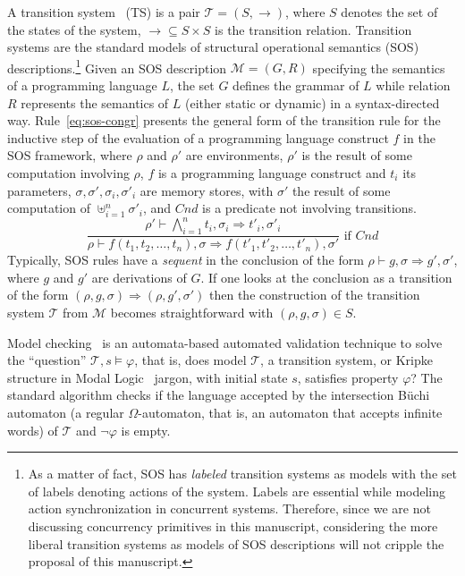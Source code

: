 \documentclass[a4paper,openany]{book}
\begin{document}
A transition system~\cite{arnold1994finite} (TS) is a pair $\mathcal{T} = (S, \rightarrow)$, where $S$ denotes the set of the states of the system, $\rightarrow \subseteq S \times S$ is the transition relation. 
%
Transition systems are the standard models of structural operational semantics (SOS) descriptions.\footnote{As a matter of fact, SOS has \emph{labeled} transition systems as models with the set of labels denoting actions of the system. Labels are essential while modeling action synchronization in concurrent systems. Therefore, since we are not discussing concurrency primitives in this manuscript, considering the more liberal transition systems as models of SOS descriptions will not cripple the proposal of this manuscript.} Given an SOS description $\mathcal{M} = (G, R)$ specifying the semantics of a programming language $L$, the set $G$ defines the grammar of $L$ while relation $R$ represents the semantics of $L$ (either static or dynamic) in a syntax-directed way.   
Rule~\ref{eq:sos-congr} presents the general form of the transition rule for 
the inductive step of the evaluation of a programming language
construct $f$ in the SOS framework, where $\rho$ and $\rho'$ are environments, $\rho'$ is the result of
some computation involving $\rho$, $f$ is a programming language
construct and $t_i$ its parameters,
$\sigma, \sigma', \sigma_i, \sigma'_i$ are memory stores, with
$\sigma'$ the result of some computation of $\uplus^n_{i=1}\sigma'_i$, and
$\mathit{Cnd}$ is a predicate not involving transitions.
\begin{equation}\label{eq:sos-congr}
\frac{\rho' \vdash \bigwedge^n_{i=1} t_i, \sigma_i \Rightarrow t'_i, \sigma'_i}
     {\rho \vdash f(t_1, t_2, \ldots, t_n), \sigma
       \Rightarrow f(t'_1, t'_2, \ldots, t'_n), \sigma'} \mbox{ if } \mathit{Cnd}
\end{equation}
Typically, SOS rules have a \emph{sequent} in the conclusion of the form $\rho \vdash g , \sigma \Rightarrow g' , \sigma'$, where $g$ and $g'$ are derivations of $G$. If one looks at the conclusion as a transition of the form $(\rho, g, \sigma) \Rightarrow (\rho, g', \sigma')$ then the construction of the transition system $\mathcal{T}$ from $\mathcal{M}$ becomes straightforward with $(\rho, g, \sigma) \in S$.

Model checking~\cite{Clarke:2000:MC:332656} is an automata-based automated validation technique to solve the ``question'' 
$\mathcal{T}, s \models \varphi$, that is, does model $\mathcal{T}$, a transition system, or Kripke structure in Modal Logic~\cite{goldblatt} jargon, with initial state $s$, satisfies property $\varphi$? The standard algorithm checks if the language accepted by the intersection B\"uchi automaton (a regular $\Omega$-automaton, that is, an automaton that accepts infinite words) of $\mathcal{T}$ and $\neg\varphi$ is empty.  
\end{document}
